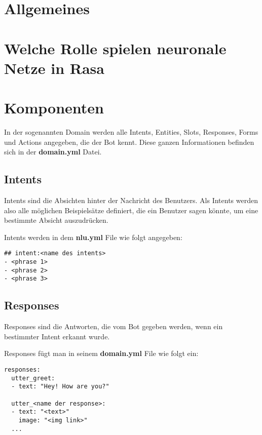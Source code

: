 \section{Allgemeines}

\section{Welche Rolle spielen neuronale Netze in Rasa}

\section{Komponenten}

In der sogenannten Domain werden alle Intents, Entities, Slots, Responses, Forms und Actions angegeben, die der Bot kennt.
Diese ganzen Informationen befinden sich in der \textbf{domain.yml} Datei.
\cite{domain}

\subsection{Intents}

Intents sind die Absichten hinter der Nachricht des Benutzers.
Als Intents werden also alle möglichen Beispielsätze definiert, die ein Benutzer sagen könnte, um eine bestimmte Absicht auszudrücken.
\cite{intents}

Intents werden in dem \textbf{nlu.yml} File wie folgt angegeben:

\begin{lstlisting}[label={lst: Intent Example}]
## intent:<name des intents>
- <phrase 1>
- <phrase 2>
- <phrase 3>
\end{lstlisting}

\subsection{Responses}

Responses sind die Antworten, die vom Bot gegeben werden, wenn ein bestimmter Intent erkannt wurde.\cite{responses}

Responses fügt man in seinem \textbf{domain.yml} File wie folgt ein:

\begin{lstlisting}[label={lst: Responses Example}]
responses:
  utter_greet:
  - text: "Hey! How are you?"

  utter_<name der response>:
  - text: "<text>"
    image: "<img link>"
  ...
\end{lstlisting}


